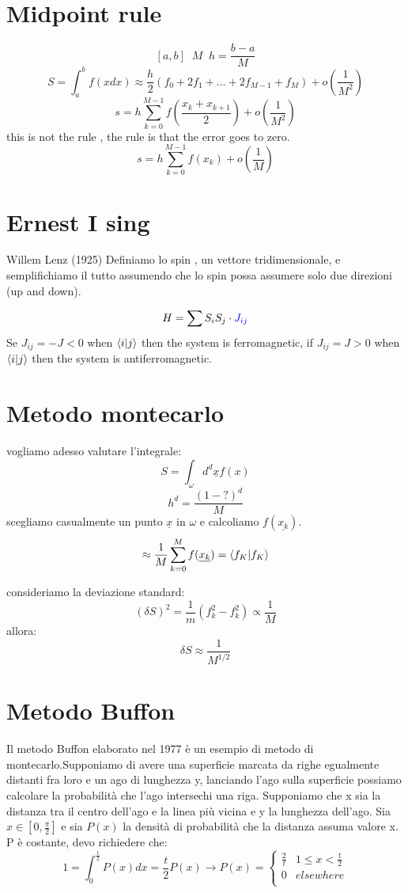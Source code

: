 \section{Midpoint rule}
 \[[a,b] \;\; M \;\; h=\frac{b-a}{M}\]
 \[S=\int_{a}^{b}f(x dx) \approx \frac{h}{2}(f_0+2f_1+...+2f_{M-1}+f_M)+o(\frac{1}{M^2})\]
 \[s=h \sum_{k=0}^{M-1} f(\frac{x_k+x_{k+1}}{2})+o(\frac{1}{M^2})\]
 this is not the rule , the rule is that the error goes to zero.
 \[s=h \sum_{k=0}^{M-1} f(x_k)+o(\frac{1}{M})\]

 \section{Ernest I sing}
Willem Lenz (1925)
Definiamo lo spin , un vettore tridimensionale, e semplifichiamo il tutto assumendo che lo spin possa assumere solo due direzioni (up and down).

\[H=\sum S_iS_j \cdot \textcolor{blue}{J_{ij}}\]
Se $J_{ij}=-J<0$ when $\braket{i}{j}$ then the system is ferromagnetic, if $J_{ij}=J>0$ when $\braket{i}{j}$ then the system is antiferromagnetic.

\section{Metodo montecarlo}
vogliamo adesso valutare l'integrale:
\[S=\int_{\omega}d^d\underline{x} f(x)\]
\[h^d=\frac{(1-?)^d}{M}\]
scegliamo casualmente un punto $\underline{x}$ in $\omega$ e calcoliamo $f(\underline{x_k})$.
\[\approx \frac{1}{M}\sum_{k=0}^{M}f(\underline{x_k})=\braket{f_K}\]

consideriamo la deviazione standard:
\[(\delta S)^2=\frac{1}{m}(f_k^2-f_k^2)\propto \frac{1}{M}\]
allora:
\[\delta S \approx \frac{1}{M^{1/2}}\]

\section{Metodo Buffon}
Il metodo Buffon elaborato nel 1977 è un esempio di metodo di montecarlo.Supponiamo di avere una superficie marcata da righe egualmente distanti fra loro e un ago di lunghezza y, lanciando l'ago sulla superficie possiamo calcolare la probabilità che l'ago intersechi una riga.
Supponiamo che x sia la distanza tra il centro dell'ago e la linea più vicina e y la lunghezza dell'ago. Sia $x \in \left[0,\frac{\pi}{2}\right]$ e sia $P(x)$ la densità di probabilità che la distanza assuma valore x. P è costante, devo richiedere che:
$$1=\int_{0}^{\frac{t}{2}}P(x)dx=\frac{t}{2}P(x) \rightarrow P(x)= \begin{cases}
   \frac{2}{t}&1 \le x < \frac{t}{2}\\
    0 & elsewhere \\
\end{cases} $$

